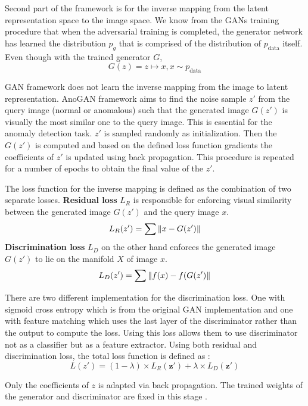 Second part of the framework is for the inverse mapping from the latent representation space to the image space. 
We know from the GANs training procedure that when the adversarial training is completed, the generator
network has learned the distribution $p_g$ that is comprised of the 
distribution of $p_{\text{data}}$ itself. 
Even though with the trained generator $G$, 
$$
G(z) = z \mapsto x,x \sim p_{\text{data}}
$$

GAN framework does not learn the inverse mapping from the image to latent representation. AnoGAN framework
aims to find the noise sample $z'$ from the query image (normal or anomalous) such that the
generated image $G(z')$ is visually the most similar one to the query image. This is essential
for the anomaly detection task. $z'$ is sampled randomly as initialization. Then the
$G(z')$ is computed and based on the defined loss function gradients the coefficients of
$z'$ is updated using back propagation. This procedure is repeated for a number of epochs to
obtain the final value of the $z'$. 

The loss function for the inverse mapping is defined as the combination of two separate losses.
\textbf{Residual loss} $L_R$ is responsible for enforcing visual similarity between the generated image
$G(z')$ and the query image $x$.
\begin{equation}
    \label{eqn:anogan_rl}
    L_R (z') = \sum \left\lVert x - G(z')\right\rVert
\end{equation} 
\textbf{Discrimination loss} $L_D$ on the other hand enforces the
generated image $G(z')$ to lie on the manifold $X$ of image $x$.
\begin{equation}
    \label{eqn:anogan_dl}
    L_D (z') = \sum  \left\lVert f(x) - f(G(z')\right\rVert
\end{equation}

There are two different implementation for the discrimination loss. One with sigmoid cross entropy
which is from the original GAN implementation \cite{Goodfellow:2014:GAN:2969033.2969125} and one
with feature matching \cite{fm} which uses the last layer of the discriminator rather than the
output to compute the loss. Using this loss allows them to use discriminator not as a classifier but
as a feature extractor. Using both residual and discrimination loss, the total loss function is
defined as :
$$L(z') = (1 - \lambda ) \times L_{R}(\boldsymbol{z'}) + \lambda \times
L_{D}(\boldsymbol{z'})$$

Only the coefficients of $z$ is adapted via back propagation. The trained weights of the generator
and discriminator are fixed in this stage \cite{Schlegl2017UnsupervisedAD}.

